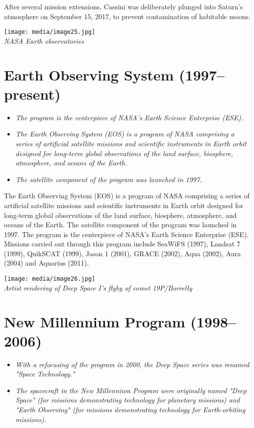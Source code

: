 After several mission extensions, Cassini was deliberately plunged into
Saturn's atmosphere on September 15, 2017, to prevent contamination of
habitable moons.

\texttt{[image: media/image25.jpg]}\\
\emph{NASA Earth observatories}

\section{Earth Observing System
(1997--present)}\label{earth-observing-system-1997present}

\begin{itemize}
\item
  \emph{The program is the centerpiece of NASA's Earth Science
  Enterprise (ESE).}
\item
  \emph{The Earth Observing System (EOS) is a program of NASA comprising
  a series of artificial satellite missions and scientific instruments
  in Earth orbit designed for long-term global observations of the land
  surface, biosphere, atmosphere, and oceans of the Earth.}
\item
  \emph{The satellite component of the program was launched in 1997.}
\end{itemize}

The Earth Observing System (EOS) is a program of NASA comprising a
series of artificial satellite missions and scientific instruments in
Earth orbit designed for long-term global observations of the land
surface, biosphere, atmosphere, and oceans of the Earth. The satellite
component of the program was launched in 1997. The program is the
centerpiece of NASA's Earth Science Enterprise (ESE). Missions carried
out through this program include SeaWiFS (1997), Landsat 7 (1999),
QuikSCAT (1999), Jason 1 (2001), GRACE (2002), Aqua (2002), Aura (2004)
and Aquarius (2011).

\texttt{[image: media/image26.jpg]}\\
\emph{Artist rendering of Deep Space I's flyby of comet 19P/Borrelly}

\section{New Millennium Program
(1998--2006)}\label{new-millennium-program-19982006}

\begin{itemize}
\item
  \emph{With a refocusing of the program in 2000, the Deep Space series
  was renamed "Space Technology."}
\item
  \emph{The spacecraft in the New Millennium Program were originally
  named "Deep Space" (for missions demonstrating technology for
  planetary missions) and "Earth Observing" (for missions demonstrating
  technology for Earth-orbiting missions).}
\end{itemize}


